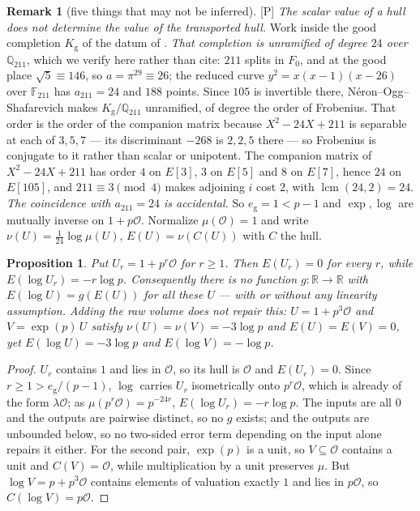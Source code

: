 \documentclass[11pt]{article}
\theoremstyle{plain}
\newtheorem{proposition}{Proposition}
\theoremstyle{definition}
\newtheorem{remark}{Remark}
\begin{document}
\begin{remark}[five things that may not be inferred]
\textup{[P]} \emph{The scalar value of a hull does not determine the value of the
transported hull.}  Work inside the good completion $K_{\mathrm g}$ of the datum of
\cite{Firstfull}.  \emph{That completion is unramified of degree $24$ over
$\mathbb{Q}_{211}$}, which we verify here rather than cite: $211$ splits in $F_0$, and
at the good place $\sqrt5\equiv146$, so $a=\pi^{29}\equiv26$; the reduced curve
$y^2=x(x-1)(x-26)$ over $\mathbb F_{211}$ has $a_{211}=24$ and $188$ points.  Since
$105$ is invertible there, N\'eron--Ogg--Shafarevich makes $K_{\mathrm g}/\mathbb Q_{211}$
unramified, of degree the order of Frobenius.  That order is the order of the companion
matrix because $X^2-24X+211$ is separable at each of $3,5,7$ --- its discriminant $-268$
is $2,2,5$ there --- so Frobenius is conjugate to it rather than scalar or unipotent.
The companion matrix of
$X^2-24X+211$ has order $4$ on $E[3]$, $3$ on $E[5]$ and $8$ on $E[7]$, hence $24$ on
$E[105]$, and $211\equiv3\pmod 4$ makes adjoining $i$ cost $2$, with
$\operatorname{lcm}(24,2)=24$.  \emph{The coincidence with $a_{211}=24$ is accidental.}
So
$e_{\mathrm g}=1<p-1$ and $\exp,\log$ are mutually inverse on $1+p\mathcal O$.
Normalize $\mu(\mathcal O)=1$ and write $\nu(U)=\tfrac1{24}\log\mu(U)$,
$E(U)=\nu(C(U))$ with $C$ the hull.

\begin{proposition}\label{p:nodescent}
Put $U_r=1+p^r\mathcal O$ for $r\ge1$.  Then $E(U_r)=0$ for every $r$, while
$E(\log U_r)=-r\log p$.  Consequently there is no function
$g:\mathbb{R}\to\mathbb{R}$ with $E(\log U)=g(E(U))$ for all these $U$ --- with or
without any linearity assumption.  Adding the raw volume does not repair this:
$U=1+p^3\mathcal O$ and $V=\exp(p)\,U$ satisfy
$\nu(U)=\nu(V)=-3\log p$ and $E(U)=E(V)=0$, yet $E(\log U)=-3\log p$ and
$E(\log V)=-\log p$.
\end{proposition}

\begin{proof}
$U_r$ contains $1$ and lies in $\mathcal O$, so its hull is $\mathcal O$ and
$E(U_r)=0$.  Since $r\ge1>e_{\mathrm g}/(p-1)$, $\log$ carries $U_r$ isometrically
onto $p^r\mathcal O$, which is already of the form $\lambda\mathcal O$; as
$\mu(p^r\mathcal O)=p^{-24r}$, $E(\log U_r)=-r\log p$.  The inputs are all $0$ and
the outputs are pairwise distinct, so no $g$ exists; and the outputs are unbounded
below, so no two-sided error term depending on the input alone repairs it either.
For the second pair, $\exp(p)$ is a unit, so $V\subseteq\mathcal O$ contains a unit
and $C(V)=\mathcal O$, while multiplication by a unit preserves $\mu$.  But
$\log V=p+p^3\mathcal O$ contains elements of valuation exactly $1$ and lies in
$p\mathcal O$, so $C(\log V)=p\mathcal O$.
\end{proof}


\end{remark}
\end{document}
